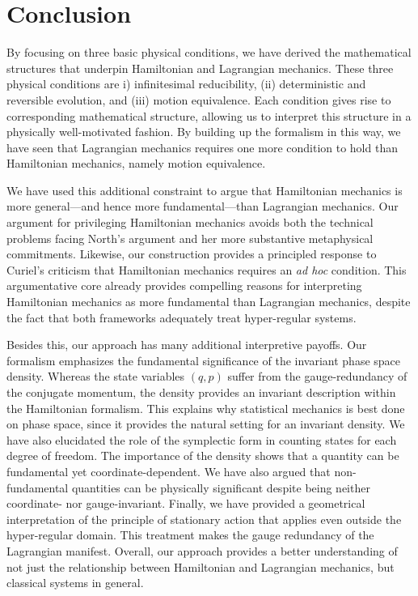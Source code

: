 \documentclass[letterpaper]{article}
\begin{document}

\section{Conclusion}
\label{conclusion}

By focusing on three basic physical conditions, we have derived the mathematical structures that underpin Hamiltonian and Lagrangian mechanics. These three physical conditions are i) infinitesimal reducibility, (ii) deterministic and reversible evolution, and (iii) motion equivalence. Each condition gives rise to corresponding mathematical structure, allowing us to interpret this structure in a physically well-motivated fashion. By building up the formalism in this way, we have seen that Lagrangian mechanics requires one more condition to hold than Hamiltonian mechanics, namely motion equivalence.

We have used this additional constraint to argue that Hamiltonian mechanics is more general---and hence more fundamental---than Lagrangian mechanics. Our argument for privileging Hamiltonian mechanics avoids both the technical problems facing North's \parencites*[]{North} argument and her more substantive metaphysical commitments. Likewise, our construction provides a principled response to Curiel's \parencites*[]{Curiel} criticism that Hamiltonian mechanics requires an \textit{ad hoc} condition. This argumentative core already provides compelling reasons for interpreting Hamiltonian mechanics as more fundamental than Lagrangian mechanics, despite the fact that both frameworks adequately treat hyper-regular systems.

Besides this, our approach has many additional interpretive payoffs. Our formalism emphasizes the fundamental significance of the invariant phase space density. Whereas the state variables $(q, p)$ suffer from the gauge-redundancy of the conjugate momentum, the density provides an invariant description within the Hamiltonian formalism. This explains why statistical mechanics is best done on phase space, since it provides the natural setting for an invariant density. We have also elucidated the role of the symplectic form in counting states for each degree of freedom. The importance of the density shows that a quantity can be fundamental yet coordinate-dependent. We have also argued that non-fundamental quantities can be physically significant despite being neither coordinate- nor gauge-invariant. Finally, we have provided a geometrical interpretation of the principle of stationary action that applies even outside the hyper-regular domain. This treatment makes the gauge redundancy of the Lagrangian manifest. Overall, our approach provides a better understanding of not just the relationship between Hamiltonian and Lagrangian mechanics, but classical systems in general.
\end{document}
